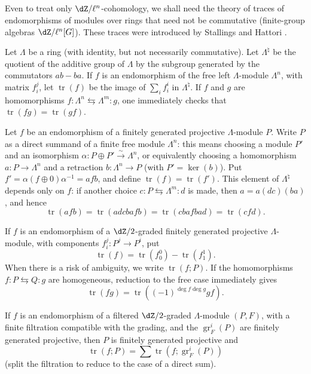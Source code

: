 \documentclass[12pt,oneside,english]{smfbook}
\DeclareMathOperator{\gr}{gr}
\DeclareMathOperator{\tr}{tr}
\newcommand{\iso}{\xrightarrow\sim}
\begin{document}
\subsection{}\label{II:4-2}

Even to treat only $\dZ/\ell^n$-cohomology, we shall need the theory of traces of endomorphisms of modules over rings that need not be commutative (finite-group algebras $\dZ/\ell^n[G]$). These traces were introduced by Stallings and Hattori \cite{ba76}.

Let $\Lambda$ be a ring (with identity, but not necessarily commutative). Let $\Lambda^\natural$ be the quotient of the additive group of $\Lambda$ by the subgroup generated by the commutators $ab-ba$. If $f$ is an endomorphism of the free left $\Lambda$-module $\Lambda^n$, with matrix $f_i^j$, let $\tr(f)$ be the image of $\sum_i f_i^i$ in $\Lambda^\natural$. If $f$ and $g$ are homomorphisms $f:\Lambda^n\leftrightarrows\Lambda^m:g$, one immediately checks that $\tr(fg)=\tr(gf)$.

Let $f$ be an endomorphism of a finitely generated projective $\Lambda$-module $P$. Write $P$ as a direct summand of a finite free module $\Lambda^n$: this means choosing a module $P'$ and an isomorphism $\alpha:P\oplus P'\iso\Lambda^n$, or equivalently choosing a homomorphism $a:P\to\Lambda^n$ and a retraction $b:\Lambda^n\to P$ (with $P'=\ker(b)$). Put $f'=\alpha(f\oplus0)\alpha^{-1}=afb$, and define $\tr(f)=\tr(f')$. This element of $\Lambda^\natural$ depends only on $f$: if another choice $c:P\leftrightarrows\Lambda^m:d$ is made, then $a=a(dc)(ba)$, and hence
\[
 \tr(a f b) = \tr(adcbafb) = \tr(cbafbad) = \tr(cfd) \text{.}
\]

If $f$ is an endomorphism of a $\dZ/2$-graded finitely generated projective $\Lambda$-module, with components $f_i^j:P^j\to P^i$, put
\[
  \tr(f) = \tr(f_0^0) - \tr(f_1^1) \text{.}
\]
When there is a risk of ambiguity, we write $\tr(f;P)$. If the homomorphisms $f:P\leftrightarrows Q:g$ are homogeneous, reduction to the free case immediately gives
\begin{equation*}\tag{4.2.1}\label{II:eq:4-2-1}
  \tr(f g) = \tr\left((-1)^{\deg f \deg g} g f\right) \text{.}
\end{equation*}

If $f$ is an endomorphism of a filtered $\dZ/2$-graded $\Lambda$-module $(P,F)$, with a finite filtration compatible with the grading, and the $\gr_F^i(P)$ are finitely generated projective, then $P$ is finitely generated projective and
\begin{equation*}\tag{4.2.2}\label{II:eq:4-2-2}
  \tr(f;P) = \sum \tr\left(f; \gr_F^i(P) \right)
\end{equation*}
(split the filtration to reduce to the case of a direct sum).
\end{document}
